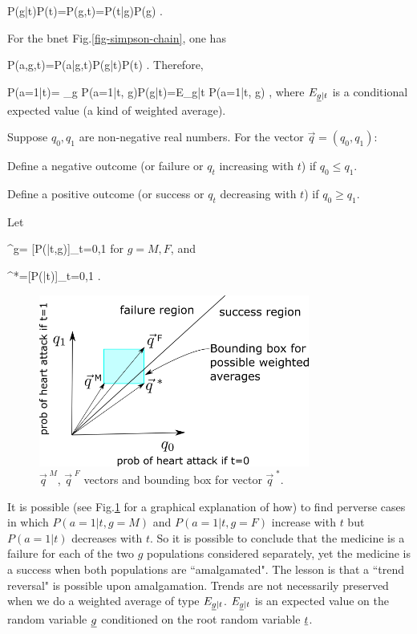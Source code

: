 \beq
P(g|t)P(t)=P(g,t)=P(t|g)P(g)
\;.
\eeq

For the bnet
Fig.\ref{fig-simpson-chain}, 
one has

\beq
P(a,g,t)=P(a|g,t)P(g|t)P(t)
\;.
\eeq
Therefore,

\beq
P(a=1|t)=
\sum_g P(a=1|t, g)P(g|t)=E_{\ul{g}|t}
P(a=1|t, \ul{g})
\;,
\eeq
where $ E_{\underline{g}|t}$ is 
a conditional expected value
 (a kind of weighted average).

Suppose $ q_0, q_1$ are 
non-negative real numbers. 
For the vector $ \vec{q}=(q_0, q_1)$:

Define a negative outcome 
(or failure or $ q_t$ 
increasing with $ t$) 
if $ q_0 \leq q_1$.

Define a positive outcome 
(or success or $ q_t$ 
decreasing with $ t$)
 if $ q_0 \geq q_1$.

Let

\beq
{}^{\;g}=
[P(|t,g)]_{t=0,1}
\;
\eeq
for $g=M,F$, and

\beq
{}^{\;*}=[P(|t)]_{t=0,1}
\;.
\eeq

\begin{figure}[h!]
\centering
\includegraphics[width=3.5in]
{simpson/q-vecs.png}
\caption{$\vec{q}^{\;M}$,
$\vec{q}^{\;F}$ vectors
and bounding box for vector $\vec{q}^{\;*}$.  } 
\label{fig-simpson-q-vecs}
\end{figure}

It is possible (see Fig.\ref{fig-simpson-q-vecs} 
for a graphical explanation of how)
 to find perverse cases in which
 $ P(a=1|t, g=M)$ and $ P(a=1|t, g=F)$
 increase with $ t$ but $ P(a=1|t)$ 
decreases with $ t$. So it is possible 
to conclude that the medicine is a failure
 for each of the two $ g$ populations 
considered separately, yet the medicine 
is a success when both populations are 
``amalgamated". The lesson is that a
 ``trend reversal" is possible 
upon amalgamation. Trends
are not necessarily preserved 
when we do a weighted average of
 type $ E_{\underline{g}|t}$. 
$ E_{\underline{g}|t}$ is an expected value
 on the random variable $ \underline{g}$
 conditioned on the root 
random variable $ \underline{t}$.

